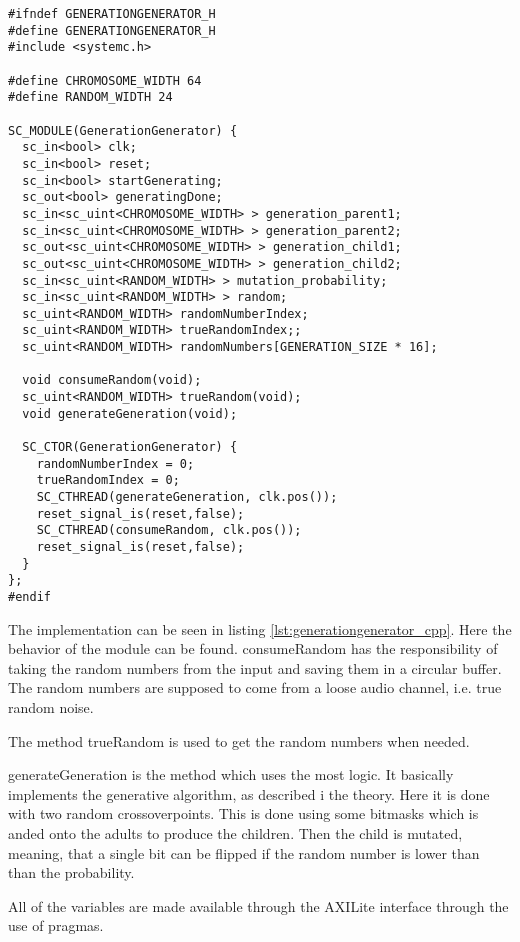 \begin{lstlisting}[style=customc++, caption={GenerationGenerator.h},label={lst:generationgenerator_h}]
#ifndef GENERATIONGENERATOR_H
#define GENERATIONGENERATOR_H
#include <systemc.h>

#define CHROMOSOME_WIDTH 64
#define RANDOM_WIDTH 24

SC_MODULE(GenerationGenerator) {
  sc_in<bool> clk;
  sc_in<bool> reset;
  sc_in<bool> startGenerating;
  sc_out<bool> generatingDone;
  sc_in<sc_uint<CHROMOSOME_WIDTH> > generation_parent1;
  sc_in<sc_uint<CHROMOSOME_WIDTH> > generation_parent2;
  sc_out<sc_uint<CHROMOSOME_WIDTH> > generation_child1;
  sc_out<sc_uint<CHROMOSOME_WIDTH> > generation_child2;
  sc_in<sc_uint<RANDOM_WIDTH> > mutation_probability;
  sc_in<sc_uint<RANDOM_WIDTH> > random;
  sc_uint<RANDOM_WIDTH> randomNumberIndex;
  sc_uint<RANDOM_WIDTH> trueRandomIndex;;
  sc_uint<RANDOM_WIDTH> randomNumbers[GENERATION_SIZE * 16];

  void consumeRandom(void);
  sc_uint<RANDOM_WIDTH> trueRandom(void);
  void generateGeneration(void);
  
  SC_CTOR(GenerationGenerator) {
    randomNumberIndex = 0;
    trueRandomIndex = 0;
    SC_CTHREAD(generateGeneration, clk.pos());
    reset_signal_is(reset,false);
    SC_CTHREAD(consumeRandom, clk.pos());
    reset_signal_is(reset,false);
  }
};
#endif
\end{lstlisting}

The implementation can be seen in listing \ref{lst:generationgenerator_cpp}. Here the behavior of the module can be found. consumeRandom has the responsibility of taking the random numbers from the input and saving them in a circular buffer. The random numbers are supposed to come from a loose audio channel, i.e. true random noise.

The method trueRandom is used to get the random numbers when needed.

generateGeneration is the method which uses the most logic. It basically implements the generative algorithm, as described i the theory. Here it is done with two random crossoverpoints. This is done using some bitmasks which is anded onto the adults to produce the children. Then the child is mutated, meaning, that a single bit can be flipped if the random number is lower than than the probability.

All of the variables are made available through the AXILite interface through the use of pragmas.

